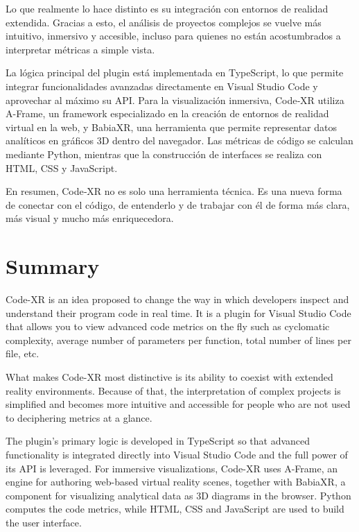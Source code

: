 \documentclass[a4paper, 12pt]{book}
\begin{document}
Lo que realmente lo hace distinto es su integración con entornos de realidad extendida. Gracias a esto, el análisis de proyectos complejos se vuelve más intuitivo, inmersivo y accesible, incluso para quienes no están acostumbrados a interpretar métricas a simple vista.


La lógica principal del plugin está implementada en TypeScript, lo que permite integrar funcionalidades avanzadas directamente en Visual Studio Code y aprovechar al máximo su API. Para la visualización inmersiva, Code‑XR utiliza A-Frame, un framework especializado en la creación de entornos de realidad virtual en la web, y BabiaXR, una herramienta que permite representar datos analíticos en gráficos 3D dentro del navegador. Las métricas de código se calculan mediante Python, mientras que la construcción de interfaces se realiza con HTML, CSS y JavaScript.


En resumen, Code‑XR no es solo una herramienta técnica. Es una nueva forma de conectar con el código, de entenderlo y de trabajar con él de forma más clara, más visual y mucho más enriquecedora.





\chapter*{Summary}

Code-XR is an idea proposed to change the way in which developers inspect and understand their program code in real time. It is a plugin for Visual Studio Code that allows you to view advanced code metrics on the fly such as cyclomatic complexity, average number of parameters per function, total number of lines per file, etc.

What makes Code-XR most distinctive is its ability to coexist with extended reality environments. Because of that, the interpretation of complex projects is simplified and becomes more intuitive and accessible for people who are not used to deciphering metrics at a glance.

The plugin's primary logic is developed in TypeScript so that advanced functionality is integrated directly into Visual Studio Code and the full power of its API is leveraged. For immersive visualizations, Code-XR uses A-Frame, an engine for authoring web-based virtual reality scenes, together with BabiaXR, a component for visualizing analytical data as 3D diagrams in the browser. Python computes the code metrics, while HTML, CSS and JavaScript are used to build the user interface.
\end{document}
